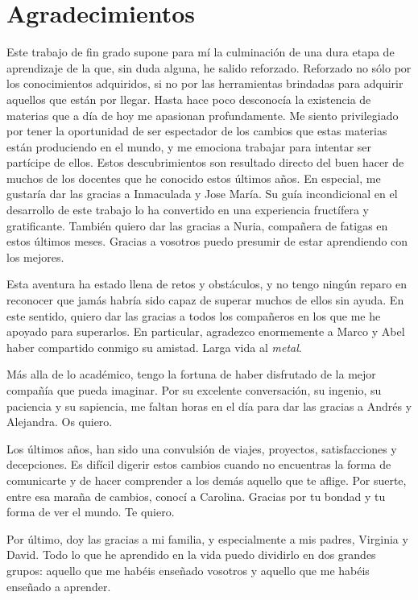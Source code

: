 
\chapter*{Agradecimientos}
Este trabajo de fin grado supone para mí la culminación de una dura etapa de aprendizaje de la que, sin duda alguna, he salido reforzado. Reforzado no sólo por los conocimientos adquiridos, si no por las herramientas brindadas para adquirir aquellos que están por llegar. Hasta hace poco desconocía la existencia de materias que a día de hoy me apasionan profundamente. Me siento privilegiado por tener la oportunidad de ser espectador de los cambios que estas materias están produciendo en el mundo, y me emociona trabajar para intentar ser partícipe de ellos. Estos descubrimientos son resultado directo del buen hacer de muchos de los docentes que he conocido estos últimos años. En especial, me gustaría dar las gracias a Inmaculada y Jose María. Su guía incondicional en el desarrollo de este trabajo lo ha convertido en una experiencia fructífera y gratificante. También quiero dar las gracias a Nuria, compañera de fatigas en estos últimos meses. Gracias a vosotros puedo presumir de estar aprendiendo con los mejores.

Esta aventura ha estado llena de retos y obstáculos, y no tengo ningún reparo en reconocer que jamás habría sido capaz de superar muchos de ellos sin ayuda. En este sentido, quiero dar las gracias a todos los compañeros en los que me he apoyado para superarlos. En particular, agradezco enormemente a Marco y Abel haber compartido conmigo su amistad. Larga vida al \emph{metal}. 

Más alla de lo académico, tengo la fortuna de haber disfrutado de la mejor compañía que pueda imaginar. Por su excelente conversación, su ingenio, su paciencia y su sapiencia, me faltan horas en el día para dar las gracias a Andrés y Alejandra. Os quiero.

Los últimos años, han sido una convulsión de viajes, proyectos, satisfacciones y decepciones. Es difícil digerir estos cambios cuando no encuentras la forma de comunicarte y de hacer comprender a los demás aquello que te aflige. Por suerte, entre esa maraña de cambios, conocí a Carolina. Gracias por tu bondad y tu forma de ver el mundo. Te quiero.

Por último, doy las gracias a mi familia, y especialmente a mis padres, Virginia y David. Todo lo que he aprendido en la vida puedo dividirlo en dos grandes grupos: aquello que me habéis enseñado vosotros y aquello que me habéis enseñado a aprender.